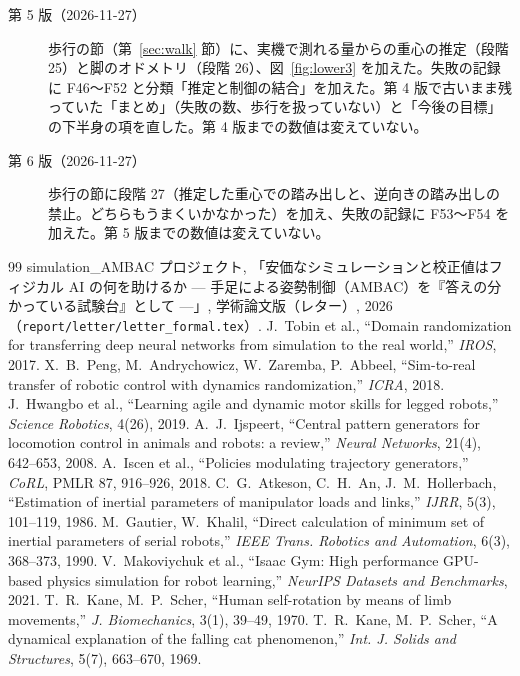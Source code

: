 \documentclass[paper=a4paper,fontsize=10pt,twocolumn,column_gap=2zw,line_length=24zw,number_of_lines=46,head_space=20mm]{jlreq}
\begin{document}
\begin{description}
\item[第 5 版（2026-11-27）] 歩行の節（第~\ref{sec:walk} 節）に、実機で測れる量からの重心の推定（段階 25）と脚のオドメトリ（段階 26）、図~\ref{fig:lower3} を加えた。失敗の記録に F46〜F52 と分類「推定と制御の結合」を加えた。第 4 版で古いまま残っていた「まとめ」（失敗の数、歩行を扱っていない）と「今後の目標」の下半身の項を直した。第 4 版までの数値は変えていない。
\item[第 6 版（2026-11-27）] 歩行の節に段階 27（推定した重心での踏み出しと、逆向きの踏み出しの禁止。どちらもうまくいかなかった）を加え、失敗の記録に F53〜F54 を加えた。第 5 版までの数値は変えていない。
\end{description}

\begin{thebibliography}{99}\footnotesize\setlength{\itemsep}{0pt}
 simulation\_AMBAC プロジェクト, 「安価なシミュレーションと校正値はフィジカル AI の何を助けるか --- 手足による姿勢制御（AMBAC）を『答えの分かっている試験台』として ---」, 学術論文版（レター）, 2026（\texttt{report/letter/letter\_formal.tex}）.
 J.~Tobin et al., ``Domain randomization for transferring deep neural networks from simulation to the real world,'' \textit{IROS}, 2017.
 X.~B.~Peng, M.~Andrychowicz, W.~Zaremba, P.~Abbeel, ``Sim-to-real transfer of robotic control with dynamics randomization,'' \textit{ICRA}, 2018.
 J.~Hwangbo et al., ``Learning agile and dynamic motor skills for legged robots,'' \textit{Science Robotics}, 4(26), 2019.
 A.~J.~Ijspeert, ``Central pattern generators for locomotion control in animals and robots: a review,'' \textit{Neural Networks}, 21(4), 642--653, 2008.
 A.~Iscen et al., ``Policies modulating trajectory generators,'' \textit{CoRL}, PMLR 87, 916--926, 2018.
 C.~G.~Atkeson, C.~H.~An, J.~M.~Hollerbach, ``Estimation of inertial parameters of manipulator loads and links,'' \textit{IJRR}, 5(3), 101--119, 1986.
 M.~Gautier, W.~Khalil, ``Direct calculation of minimum set of inertial parameters of serial robots,'' \textit{IEEE Trans. Robotics and Automation}, 6(3), 368--373, 1990.
 V.~Makoviychuk et al., ``Isaac Gym: High performance GPU-based physics simulation for robot learning,'' \textit{NeurIPS Datasets and Benchmarks}, 2021.
 T.~R.~Kane, M.~P.~Scher, ``Human self-rotation by means of limb movements,'' \textit{J. Biomechanics}, 3(1), 39--49, 1970.
 T.~R.~Kane, M.~P.~Scher, ``A dynamical explanation of the falling cat phenomenon,'' \textit{Int. J. Solids and Structures}, 5(7), 663--670, 1969.

\end{thebibliography}
\end{document}
